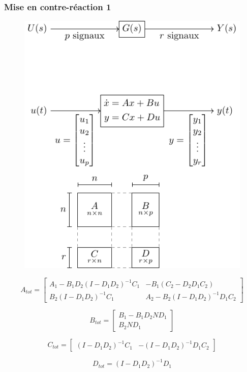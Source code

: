 \documentclass[resume]{subfiles}
\begin{document}
\subsubsection{Mise en contre-réaction 1}
\begin{figure}[H]
\centering
\includegraphics[scale=1,page=4]{drwg_0.pdf}
\end{figure}
\begin{small}
$$A_{tot}=\begin{bmatrix} A_1 - B_1D_2(I-D_1D_2)^{-1}C_1 & -B_1(C_2-D_2D_1C_2)\\B_2(I-D_1D_2)^{-1}C_1 & A_2-B_2(I-D_1D_2)^{-1}D_1C_2\end{bmatrix}$$
\end{small}

$$B_{tot}=\begin{bmatrix}B_1-B_1D_2ND_1\\B_2ND_1\end{bmatrix}$$

$$C_{tot}=\begin{bmatrix}(I-D_1D_2)^{-1}C_1 & -(I-D_1D_2)^{-1}D_1C_2\end{bmatrix}$$

$$D_{tot}=(I-D_1D_2)^{-1}D_1$$ 
\end{document}
